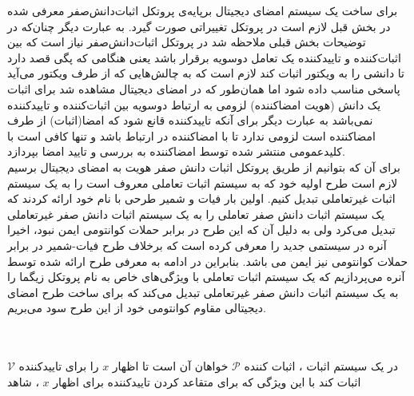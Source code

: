 برای ساخت یک سیستم امضای دیجیتال برپایه‌ی پروتکل اثبات‌دانش‌صفر معرفی شده در بخش قبل لازم است در پروتکل تغییراتی صورت گیرد. به عبارت دیگر چنان‌که در توضیحات بخش قبلی ملاحظه شد در پروتکل اثبات‌دانش‌صفر نیاز است که بین اثبات‌کننده و تاییدکننده یک تعامل دوسویه برقرار باشد یعنی هنگامی که پگی قصد دارد تا دانشی را به ویکتور اثبات کند لازم است که به چالش‌هایی که از طرف ویکتور می‌آید پاسخی مناسب داده شود  اما همان‌طور که در امضای دیجیتال مشاهده شد برای اثبات یک دانش (هویت امضاکننده) لزومی به ارتباط دوسویه بین اثبات‌کننده و تاییدکننده نمی‌باشد به عبارت دیگر برای آنکه تاییدکننده قانع شود که امضا(اثبات) از طرف امضاکننده است لزومی ندارد تا با امضاکننده در ارتباط باشد و تنها کافی است با کلیدعمومی منتشر شده توسط امضاکننده به بررسی و تایید امضا بپردازد. 
\\
برای آن که بتوانیم از طریق پروتکل اثبات دانش صفر هویت به امضای دیجیتال برسیم لازم است طرح اولیه خود که به سیستم اثبات تعاملی 
معروف است را به یک سیستم اثبات غیرتعاملی
 تبدیل کنیم. اولین بار فیات و شمیر طرحی با نام خود ارائه کردند
\cite{fiat@prove}
که یک سیستم اثبات دانش صفر تعاملی را به یک سیستم اثبات دانش صفر غیرتعاملی تبدیل می‌کرد ولی به دلیل آن که این طرح در برابر حملات کوانتومی ایمن نبود، اخیرا آنره در
\cite{unruh}
سیستمی  جدید را معرفی کرده است که برخلاف طرح فیات-شمیر در برابر حملات کوانتومی نیز ایمن می باشد. بنابراین در ادامه به معرفی طرح ارائه شده توسط آنره می‌پردازیم که یک سیستم اثبات تعاملی با ویژگی‌های خاص به نام پروتکل زیگما را به یک سیستم اثبات دانش صفر غیرتعاملی تبدیل می‌کند که برای ساخت طرح امضای دیجیتالی مقاوم کوانتومی خود از این طرح سود می‌بریم.
\iffalse
یک سیستم اثبات دانش صفر تعاملی را به سیستم اثبات دانش صفر غیرتعاملی متناظر با آن انتقال می‌دهد. این ساخت ، ویژگی استخراج آنلاین
\LTRfootnote{online extractability}
را که اجازه می‌دهد شاهد(کلید خصوصی) را از یک متخاصم موفق بدون چرخش
\LTRfootnote{rewinding}
استخراج کنیم ، را دارا می‌باشد.
\fi
\iffalse
در ابتدای امر این فرص را داریم که تمام بخش های این پروتکل به یک اوراکل تصادفی کوانتومی 
\LTRfootnote{quantum random oracle}
$H$
دسترسی دارند.
\fi
\\
\\
در یک سیستم اثبات ، اثبات کننده 
$\mathcal{P}$
خواهان آن است تا اظهار 
$x$
را برای تاییدکننده 
$\mathcal{V}$
اثبات کند با این ویژگی که برای متقاعد کردن تاییدکننده برای اظهار
$x$
، شاهد 
